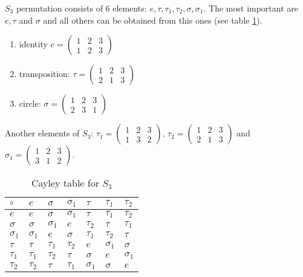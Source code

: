 \begin{appendices}
\begin{example}[$S_3$ group]
    $S_3$ permutation consists of 6 elements: $e, \tau, \tau_1, \tau_2,
    \sigma, \sigma_1$. The most important are $e, \tau$ and $\sigma$
    and all others can be obtained from this ones (see table
    \ref{tab:CayleyS3}).
  \begin{enumerate}
  \item identity
    \(
    e = \begin{pmatrix}
      1 & 2 & 3\\
      1 & 2 & 3
    \end{pmatrix}
    \) 
  \item transposition:
    \(
    \tau = \begin{pmatrix}
      1 & 2 & 3\\
      2 & 1 & 3
    \end{pmatrix}
    \) 
  \item circle:
    \(
    \sigma = \begin{pmatrix}
      1 & 2 & 3\\
      2 & 3 & 1
    \end{pmatrix}
    \) 
  \end{enumerate}

  Another elements of $S_3$:
  \(
  \tau_1 = \begin{pmatrix}
    1 & 2 & 3\\
    1 & 3 & 2
  \end{pmatrix}
  \),
  \(
  \tau_2 = \begin{pmatrix}
    1 & 2 & 3\\
    2 & 1 & 3
  \end{pmatrix}
  \) and
  \(
  \sigma_1 = \begin{pmatrix}
    1 & 2 & 3\\
    3 & 1 & 2
  \end{pmatrix}
  \).    

  \begin{table}
    \centering
    \caption{Cayley table for $S_3$ \cite{wiki:permutationgroups}}
    \label{tab:CayleyS3}
    \begin{tabular}{l|llllll}
      \toprule
      $\circ$ & $e$ & $\sigma$ & $\sigma_1$ & $\tau$ & $\tau_1$ & $\tau_2$\\
      \midrule
      $e$ & $e$ & $\sigma$ & $\sigma_1$ & $\tau$ & $\tau_1$ & $\tau_2$\\
      $\sigma$ & $\sigma$ & $\sigma_1$ & $e$ & $\tau_2$ & $\tau$ & $\tau_1$\\
      $\sigma_1$ & $\sigma_1$ & $e$ & $\sigma$ & $\tau_1$ & $\tau_2$ & $\tau$\\
      $\tau$ & $\tau$ & $\tau_1$ & $\tau_2$ & $e$ & $\sigma_1$ & $\sigma$\\
      $\tau_1$ & $\tau_1$ & $\tau_2$ & $\tau$ & $\sigma$ & $e$ & $\sigma_1$\\
      $\tau_2$ & $\tau_2$ & $\tau$ & $\tau_1$ & $\sigma_1$ & $\sigma$ & $e$\\
      \bottomrule
    \end{tabular}
  \end{table}


\end{example}
\end{appendices}

